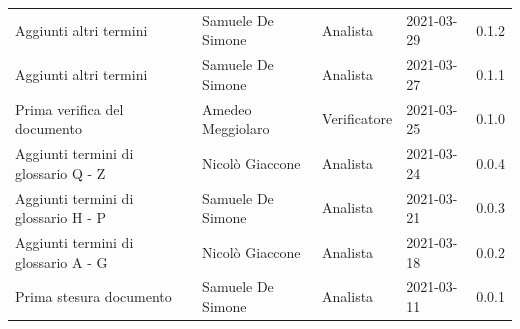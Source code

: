 \documentclass[a4paper]{article}
\begin{document}
\begin{center}
\begin{table}[h!]
\begin{tabular}{p{140px} p{90px} p{70px} p{60px} p{45px}}
            Aggiunti altri termini                                    & Samuele De Simone & Analista       & 2021-03-29    & 0.1.2             \\
            Aggiunti altri termini                                    & Samuele De Simone & Analista       & 2021-03-27    & 0.1.1             \\
            Prima verifica del documento                              & Amedeo Meggiolaro & Verificatore   & 2021-03-25    & 0.1.0             \\
            Aggiunti termini di glossario Q - Z                       & Nicolò Giaccone   & Analista       & 2021-03-24    & 0.0.4             \\
            Aggiunti termini di glossario H - P                       & Samuele De Simone & Analista       & 2021-03-21    & 0.0.3             \\
            Aggiunti termini di glossario A - G                       & Nicolò Giaccone   & Analista       & 2021-03-18    & 0.0.2             \\
            Prima stesura documento                                   & Samuele De Simone & Analista       & 2021-03-11    & 0.0.1             \\
        \end{tabular}
    \end{table}
\end{center}

\newpage
\tableofcontents
\newpage
\appendix


























\end{document}
